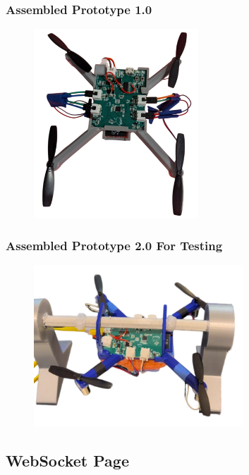 \pagebreak
\subsubsection{Assembled Prototype 1.0}

\begin{figure}[H]
    \centering
    \includegraphics[width=0.55\textwidth]{img/prototype-1-2.png}
\end{figure}

\subsubsection{Assembled Prototype 2.0 For Testing}

\begin{figure}[H]
    \centering
    \includegraphics[width=0.7\textwidth]{img/prototype-2.png}
\end{figure}


\subsection{WebSocket Page}
\label{app:websocket}

